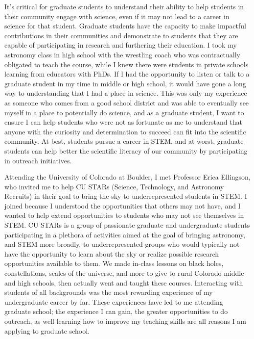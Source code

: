 \documentclass[12pt,letterpaper]{article}
\begin{document}
It’s critical for graduate students to understand their ability to help students in their community engage with science, even if it may not lead to a career in science for that student. Graduate students have the capacity to make impactful contributions in their communities and demonstrate to students that they are capable of participating in research and furthering their education. I took my astronomy class in high school with the wrestling coach who was contractually obligated to teach the course, while I knew there were students in private schools learning from educators with PhDs. If I had the opportunity to listen or talk to a graduate student in my time in middle or high school, it would have gone a long way to understanding that I had a place in science. This was only my experience as someone who comes from a good school district and was able to eventually see myself in a place to potentially do science, and as a graduate student, I want to ensure I can help students who were not as fortunate as me to understand that anyone with the curiosity and determination to succeed can fit into the scientific community. At best, students pursue a career in STEM, and at worst, graduate students can help better the scientific literacy of our community by participating in outreach initiatives.

Attending the University of Colorado at Boulder, I met Professor Erica Ellingson, who invited me to help CU STARs (Science, Technology, and Astronomy Recruits) in their goal to bring the sky to underrepresented students in STEM. I joined because I understood the opportunities that others may not have, and I wanted to help extend opportunities to students who may not see themselves in STEM. CU STARs is a group of passionate graduate and undergraduate students participating in a plethora of activities aimed at the goal of bringing astronomy, and STEM more broadly, to underrepresented groups who would typically not have the opportunity to learn about the sky or realize possible research opportunities available to them. We made in-class lessons on black holes, constellations, scales of the universe, and more to give to rural Colorado middle and high schools, then actually went and taught these courses. Interacting with students of all backgrounds was the most rewarding experience of my undergraduate career by far. These experiences have led to me attending graduate school; the experience I can gain, the greater opportunities to do outreach, as well learning how to improve my teaching skills are all reasons I am applying to graduate school. 
\end{document}
